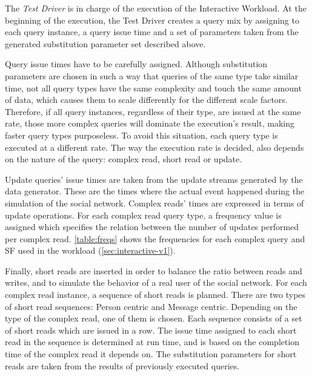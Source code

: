 The \emph{Test Driver} is in charge of the execution of the Interactive Workload.
At the beginning of the execution, the Test Driver creates a query mix by
assigning to each query instance, a query issue time and a set of parameters
taken from the generated substitution parameter set described above.  

Query issue times have to be carefully assigned. Although substitution
parameters are chosen in such a way that queries of the same type take similar
time, not all query types have the same complexity and touch the same amount of
data, which causes them to scale differently for the different scale factors.
Therefore, if all query instances, regardless of their type, are issued
at the same rate, those more complex queries will dominate the execution's
result, making faster query types purposeless. To avoid this situation, each
query type is executed at a different rate. The way the execution rate is decided,
also depends on the nature of the query: complex read, short read or update.

Update queries' issue times are taken from the update streams generated by the
data generator. These are the times where the actual event happened during the
simulation of the social network. Complex reads' times are expressed in terms
of update operations. For each complex read query type, a frequency value is
assigned which specifies the relation between the number of updates performed
per complex read. \autoref{table:freqs} shows the frequencies for each complex query and SF used in the \interactivevone workload (\autoref{sec:interactive-v1}).



Finally, short reads are inserted in order to balance the ratio between reads
and writes, and to simulate the behavior of a real user of the social network.
For each complex read instance, a sequence of short reads is planned. There are two
types of short read sequences: Person centric and Message centric. Depending on
the type of the complex read, one of them is chosen. Each sequence consists of
a set of short reads which are issued in a row. The issue time assigned to each
short read in the sequence is determined at run time, and is based on the
completion time of the complex read it depends on. 
The substitution parameters for short reads are taken from the results of previously
executed queries.

